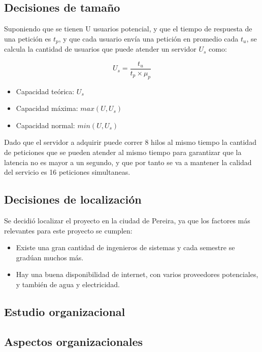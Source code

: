\documentclass[a4paper, 12pt, oneside]{article}
\begin{document}
	\subsection{Decisiones de tamaño}
	Suponiendo que se tienen U usuarios potencial, y que el tiempo de respuesta de una petición es $t_p$, y que cada usuario envía una petición en promedio cada $t_u$, se calcula la cantidad de usuarios que puede atender un servidor $U_s$ como:
  
	\begin{equation}
	U_s = \frac{t_u}{t_p \times \mu_p} 
	\label{eq:capacidad}
	\end{equation}

	\begin{itemize}
	 \item Capacidad teórica: $U_s$
	 \item Capacidad máxima: $max(U, U_s)$
	 \item Capacidad normal: $min(U, U_s)$
	\end{itemize}
	
	Dado que el servidor a adquirir puede correr 8 hilos al mismo tiempo la cantidad de peticiones que se pueden atender al mismo tiempo para garantizar que la latencia no es mayor a un segundo, y que por tanto se va a mantener la calidad del servicio es 16 peticiones simultaneas.	
	
	\subsection{Decisiones de localización}
	Se decidió localizar el proyecto en la ciudad de Pereira, ya que los factores más relevantes para este proyecto se cumplen: 

	\begin{itemize}
	 \item Existe una gran cantidad de ingenieros de sistemas y cada semestre se gradúan muchos más.
	 \item Hay una buena disponibilidad de internet, con varios proveedores potenciales, y también de agua y electricidad.
	\end{itemize}
	\clearpage
	
	\begin{center}
	\section{Estudio organizacional}
	\end{center}
	
	\subsection{Aspectos organizacionales}
\end{document}
